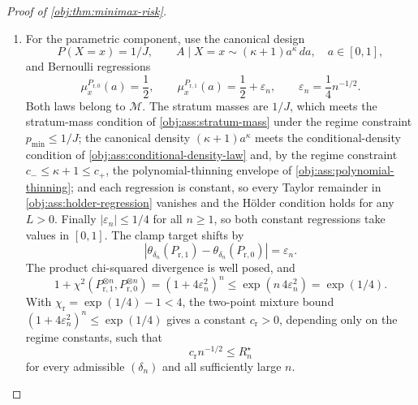 \begin{proof}[Proof of \cref{obj:thm:minimax-risk}]
\begin{enumerate}
\item For the parametric component, use the canonical design
\[
P(X=x)=1/J,
\qquad
A\mid X=x\sim (\kappa+1)a^\kappa\,da,
\quad a\in[0,1],
\]
and Bernoulli regressions
\[
\mu_{x}^{P_{\mathrm r,0}}(a)=\frac12,
\qquad
\mu_{x}^{P_{\mathrm r,1}}(a)=\frac12+\varepsilon_n,
\qquad
\varepsilon_n=\frac14 n^{-1/2}.
\]
Both laws belong to \(\mathcal M\).  The stratum masses are \(1/J\), which meets the stratum-mass condition of \cref{obj:ass:stratum-mass} under the regime constraint \(p_{\min}\le1/J\); the canonical density \((\kappa+1)a^\kappa\) meets the conditional-density condition of \cref{obj:ass:conditional-density-law} and, by the regime constraint \(c_-\le\kappa+1\le c_+\), the polynomial-thinning envelope of \cref{obj:ass:polynomial-thinning}; and each regression is constant, so every Taylor remainder in \cref{obj:ass:holder-regression} vanishes and the Hölder condition holds for any \(L>0\).  Finally \(|\varepsilon_n|\le1/4\) for all \(n\ge1\), so both constant regressions take values in \([0,1]\).
The clamp target shifts by
\[
\left|
\theta_{\delta_n}(P_{\mathrm r,1})
-
\theta_{\delta_n}(P_{\mathrm r,0})
\right|
=\varepsilon_n .
\]
The product chi-squared divergence is well posed, and
\[
1+\chi^2(P_{\mathrm r,1}^{\otimes n},P_{\mathrm r,0}^{\otimes n})
=
(1+4\varepsilon_n^2)^n
\le
\exp(n\,4\varepsilon_n^2)
=
\exp(1/4).
\]
With \(\chi_{\mathrm r}=\exp(1/4)-1<4\), the two-point mixture bound \((1+4\varepsilon_n^2)^n\le\exp(1/4)\) gives a constant
\(c_{\mathrm r}>0\), depending only on the regime constants, such that
\[
c_{\mathrm r}n^{-1/2}\le R_n^\star
\]
for every admissible \((\delta_n)\) and all sufficiently large \(n\).


\end{enumerate}
\end{proof}
